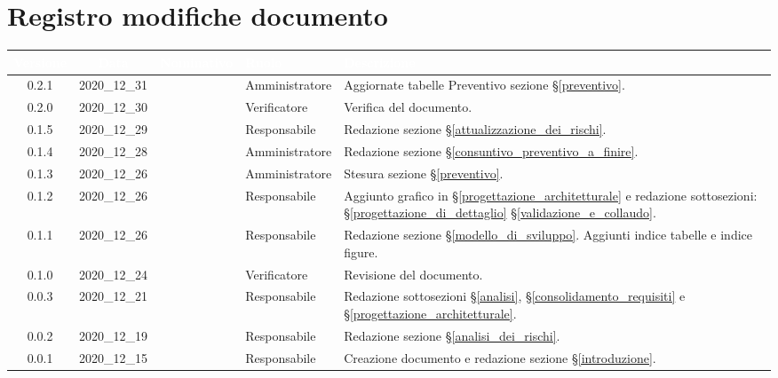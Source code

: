 \section*{Registro modifiche documento}
{

     
\renewcommand{\arraystretch}{1.5}
\centering
\begin{longtable}{ c c  C{3cm} C{3cm} C{3.2cm}}


 \textcolor{white}{\textbf{Versione}}&
    \textcolor{white}{\textbf{Data}}&
    \textcolor{white}{\textbf{Nominativo}}&
    \textcolor{white}{\textbf{Ruolo}}&
    \textcolor{white}{\textbf{Descrizione}}\\	
    \endhead

	0.2.1 & 2020\_12\_31 & \TG{} & Amministratore & Aggiornate tabelle Preventivo sezione \S\ref{preventivo}.\\

	0.2.0 & 2020\_12\_30 & \TG{} & Verificatore & Verifica del documento.\\

    0.1.5 & 2020\_12\_29 & \MM{} & Responsabile & Redazione sezione \S\ref{attualizzazione_dei_rischi}. \\

    0.1.4 & 2020\_12\_28 & \PC{} & Amministratore & Redazione sezione \S\ref{consuntivo_preventivo_a_finire}. \\

    0.1.3 & 2020\_12\_26 & \PC{} & Amministratore & Stesura sezione \S\ref{preventivo}. \\

    0.1.2 & 2020\_12\_26 & \MM{} & Responsabile & Aggiunto grafico in \S\ref{progettazione_architetturale} e redazione sottosezioni:  \S\ref{progettazione_di_dettaglio} \S\ref{validazione_e_collaudo}. \\

    0.1.1 & 2020\_12\_26 & \MM{} & Responsabile & Redazione sezione \S\ref{modello_di_sviluppo}. Aggiunti indice tabelle e indice figure. \\

    0.1.0 & 2020\_12\_24 & \PC{} & Verificatore & Revisione del documento.\\

    0.0.3 & 2020\_12\_21 & \MM{} & Responsabile & Redazione sottosezioni \S\ref{analisi}, \S\ref{consolidamento_requisiti} e \S\ref{progettazione_architetturale}. \\

    0.0.2 & 2020\_12\_19 & \MM{} & Responsabile & Redazione sezione \S\ref{analisi_dei_rischi}.\\

    0.0.1 & 2020\_12\_15 & \MM{} & Responsabile & Creazione documento e redazione sezione \S\ref{introduzione}.
			
\end{longtable}
}
